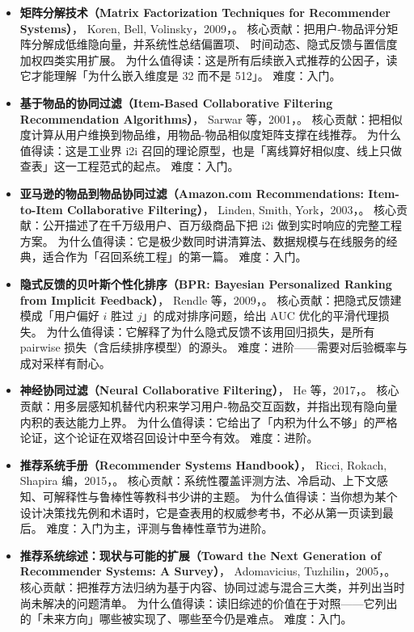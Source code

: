 \begin{itemize}
  \item \textbf{矩阵分解技术（Matrix Factorization Techniques for Recommender Systems）}，
        Koren, Bell, Volinsky，2009，\cite{koren2009mf}。
        核心贡献：把用户-物品评分矩阵分解成低维隐向量，并系统性总结偏置项、
        时间动态、隐式反馈与置信度加权四类实用扩展。
        为什么值得读：这是所有后续嵌入式推荐的公因子，读它才能理解「为什么嵌入维度是 32 而不是 512」。
        难度：入门。
  \item \textbf{基于物品的协同过滤（Item-Based Collaborative Filtering Recommendation Algorithms）}，
        Sarwar 等，2001，\cite{sarwar2001itemcf}。
        核心贡献：把相似度计算从用户维换到物品维，用物品-物品相似度矩阵支撑在线推荐。
        为什么值得读：这是工业界 i2i 召回的理论原型，也是「离线算好相似度、线上只做查表」这一工程范式的起点。
        难度：入门。
  \item \textbf{亚马逊的物品到物品协同过滤（Amazon.com Recommendations: Item-to-Item Collaborative Filtering）}，
        Linden, Smith, York，2003，\cite{linden2003amazon}。
        核心贡献：公开描述了在千万级用户、百万级商品下把 i2i 做到实时响应的完整工程方案。
        为什么值得读：它是极少数同时讲清算法、数据规模与在线服务的经典，适合作为「召回系统工程」的第一篇。
        难度：入门。
  \item \textbf{隐式反馈的贝叶斯个性化排序（BPR: Bayesian Personalized Ranking from Implicit Feedback）}，
        Rendle 等，2009，\cite{rendle2009bpr}。
        核心贡献：把隐式反馈建模成「用户偏好 $i$ 胜过 $j$」的成对排序问题，给出 AUC 优化的平滑代理损失。
        为什么值得读：它解释了为什么隐式反馈不该用回归损失，是所有 pairwise 损失（含后续排序模型）的源头。
        难度：进阶——需要对后验概率与成对采样有耐心。
  \item \textbf{神经协同过滤（Neural Collaborative Filtering）}，
        He 等，2017，\cite{he2017ncf}。
        核心贡献：用多层感知机替代内积来学习用户-物品交互函数，并指出现有隐向量内积的表达能力上界。
        为什么值得读：它给出了「内积为什么不够」的严格论证，这个论证在双塔召回设计中至今有效。
        难度：进阶。
  \item \textbf{推荐系统手册（Recommender Systems Handbook）}，
        Ricci, Rokach, Shapira 编，2015，\cite{ricci2015recsys}。
        核心贡献：系统性覆盖评测方法、冷启动、上下文感知、可解释性与鲁棒性等教科书少讲的主题。
        为什么值得读：当你想为某个设计决策找先例和术语时，它是查表用的权威参考书，不必从第一页读到最后。
        难度：入门为主，评测与鲁棒性章节为进阶。
  \item \textbf{推荐系统综述：现状与可能的扩展（Toward the Next Generation of Recommender Systems: A Survey）}，
        Adomavicius, Tuzhilin，2005，\cite{adomavicius2005survey}。
        核心贡献：把推荐方法归纳为基于内容、协同过滤与混合三大类，并列出当时尚未解决的问题清单。
        为什么值得读：读旧综述的价值在于对照——它列出的「未来方向」哪些被实现了、哪些至今仍是难点。
        难度：入门。
\end{itemize}

